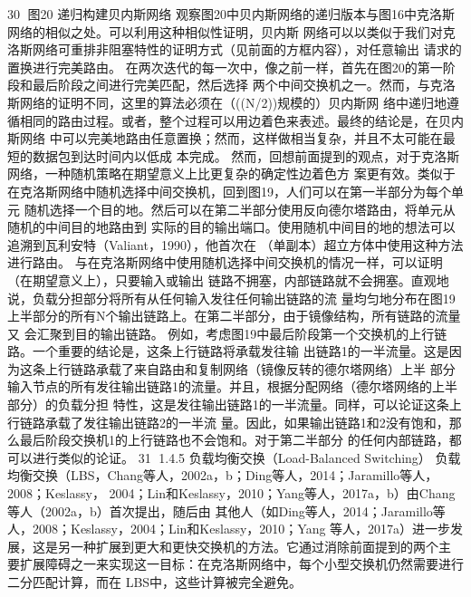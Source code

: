                                                30
图20 递归构建贝内斯网络
观察图20中贝内斯网络的递归版本与图16中克洛斯网络的相似之处。可以利用这种相似性证明，贝内斯
网络可以以类似于我们对克洛斯网络可重排非阻塞特性的证明方式（见前面的方框内容），对任意输出
请求的置换进行完美路由。
在两次迭代的每一次中，像之前一样，首先在图20的第一阶段和最后阶段之间进行完美匹配，然后选择
两个中间交换机之一。然而，与克洛斯网络的证明不同，这里的算法必须在（((N/2))规模的）贝内斯网
络中递归地遵循相同的路由过程。或者，整个过程可以用边着色来表述。最终的结论是，在贝内斯网络
中可以完美地路由任意置换；然而，这样做相当复杂，并且不太可能在最短的数据包到达时间内以低成
本完成。
然而，回想前面提到的观点，对于克洛斯网络，一种随机策略在期望意义上比更复杂的确定性边着色方
案更有效。类似于在克洛斯网络中随机选择中间交换机，回到图19，人们可以在第一半部分为每个单元
随机选择一个目的地。然后可以在第二半部分使用反向德尔塔路由，将单元从随机的中间目的地路由到
实际的目的输出端口。使用随机中间目的地的想法可以追溯到瓦利安特（Valiant，1990），他首次在
（单副本）超立方体中使用这种方法进行路由。
与在克洛斯网络中使用随机选择中间交换机的情况一样，可以证明（在期望意义上），只要输入或输出
链路不拥塞，内部链路就不会拥塞。直观地说，负载分担部分将所有从任何输入发往任何输出链路的流
量均匀地分布在图19上半部分的所有N个输出链路上。在第二半部分，由于镜像结构，所有链路的流量又
会汇聚到目的输出链路。
例如，考虑图19中最后阶段第一个交换机的上行链路。一个重要的结论是，这条上行链路将承载发往输
出链路1的一半流量。这是因为这条上行链路承载了来自路由和复制网络（镜像反转的德尔塔网络）上半
部分输入节点的所有发往输出链路1的流量。并且，根据分配网络（德尔塔网络的上半部分）的负载分担
特性，这是发往输出链路1的一半流量。同样，可以论证这条上行链路承载了发往输出链路2的一半流
量。因此，如果输出链路1和2没有饱和，那么最后阶段交换机1的上行链路也不会饱和。对于第二半部分
的任何内部链路，都可以进行类似的论证。
                                                31
1.4.5 负载均衡交换（Load-Balanced Switching）
负载均衡交换（LBS，Chang等人，2002a，b；Ding等人，2014；Jaramillo等人，2008；Keslassy，
2004；Lin和Keslassy，2010；Yang等人，2017a，b）由Chang等人（2002a，b）首次提出，随后由
其他人（如Ding等人，2014；Jaramillo等人，2008；Keslassy，2004；Lin和Keslassy，2010；Yang
等人，2017a）进一步发展，这是另一种扩展到更大和更快交换机的方法。它通过消除前面提到的两个主
要扩展障碍之一来实现这一目标：在克洛斯网络中，每个小型交换机仍然需要进行二分匹配计算，而在
LBS中，这些计算被完全避免。




